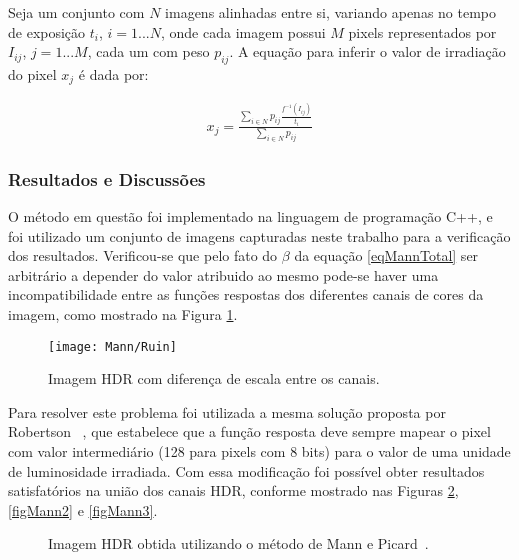 Seja um conjunto com $N$ imagens alinhadas entre si, variando apenas no tempo de exposição $t_{i}$, $i = 1 ... N$, onde cada imagem possui $M$ pixels representados por $I_{ij}$, $j = 1... M$, cada um com peso $p_{ij}$. A equação para inferir o valor de irradiação do pixel $x_{j}$ é dada por:

\begin{align} \label{eqMannGeracao}
          x_{j} = \frac{\sum\limits_{i \in N}{p_{ij}\frac{f^{-1}(I_{ij})}{t_{i}}}}{\sum\limits_{i \in N}{p_{ij}}}
\end{align}

\subsubsection{Resultados e Discussões} \label{metodoMannResultado}

O método em questão foi implementado na linguagem de programação C++, e foi utilizado um conjunto de imagens capturadas neste trabalho para a verificação dos resultados. Verificou-se que pelo fato do $\beta$ da equação \ref{eqMannTotal} ser arbitrário  a depender do valor atribuido ao mesmo pode-se haver uma incompatibilidade entre as funções respostas dos diferentes canais de cores da imagem, como mostrado na Figura \ref{figMannFigErr}.

\begin{figure}[H]
  \centering
  \texttt{[image: Mann/Ruin]}
  \caption{Imagem HDR com diferença de escala entre os canais.}
  \label{figMannFigErr}
\end{figure}

Para resolver este problema foi utilizada a mesma solução proposta por Robertson \etal~\cite{robertson}, que estabelece que a função resposta deve sempre mapear o pixel com valor intermediário (128 para pixels com 8 bits) para o valor de uma unidade de luminosidade irradiada. Com essa modificação foi possível obter resultados satisfatórios na união dos canais HDR, conforme mostrado nas Figuras \ref{figMann1}, \ref{figMann2} e \ref{figMann3}.

\begin{figure}[H]
  \centering
  \quad %
  \caption{Imagem HDR obtida utilizando o método de Mann e Picard~\protect\cite{mann}.}
  \label{figMann1}
\end{figure}

